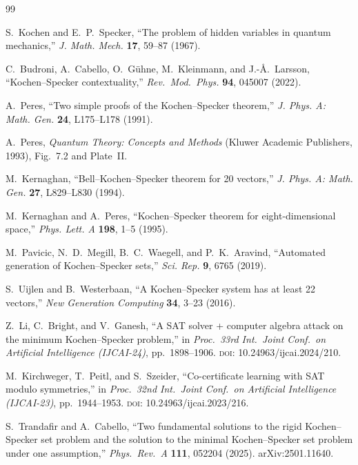 \documentclass[11pt,a4paper]{article}
\theoremstyle{definition}
\theoremstyle{remark}
\begin{document}
\begin{thebibliography}{99}

S.~Kochen and E.~P.~Specker, ``The problem of hidden variables in quantum mechanics,''
\textit{J. Math. Mech.} \textbf{17}, 59--87 (1967).

C.~Budroni, A.~Cabello, O.~G\"uhne, M.~Kleinmann, and J.-\AA.~Larsson,
``Kochen--Specker contextuality,'' \textit{Rev.\ Mod.\ Phys.} \textbf{94}, 045007 (2022).

A.~Peres, ``Two simple proofs of the Kochen--Specker theorem,''
\textit{J. Phys. A: Math. Gen.} \textbf{24}, L175--L178 (1991).

A.~Peres, \textit{Quantum Theory: Concepts and Methods} (Kluwer Academic Publishers, 1993),
Fig.~7.2 and Plate~II.

M.~Kernaghan, ``Bell--Kochen--Specker theorem for 20 vectors,''
\textit{J. Phys. A: Math. Gen.} \textbf{27}, L829--L830 (1994).

M.~Kernaghan and A.~Peres, ``Kochen--Specker theorem for eight-dimensional space,''
\textit{Phys. Lett. A} \textbf{198}, 1--5 (1995).

M.~Pavicic, N.~D.~Megill, B.~C.~Waegell, and P.~K.~Aravind,
``Automated generation of Kochen--Specker sets,'' \textit{Sci. Rep.} \textbf{9}, 6765 (2019).

S.~Uijlen and B.~Westerbaan, ``A Kochen--Specker system has at least 22 vectors,''
\textit{New Generation Computing} \textbf{34}, 3--23 (2016).

Z.~Li, C.~Bright, and V.~Ganesh,
``A SAT solver + computer algebra attack on the minimum Kochen--Specker problem,''
in \textit{Proc.\ 33rd Int.\ Joint Conf.\ on Artificial Intelligence (IJCAI-24)}, pp.~1898--1906.
\textsc{doi}: 10.24963/ijcai.2024/210.

M.~Kirchweger, T.~Peitl, and S.~Szeider,
``Co-certificate learning with SAT modulo symmetries,''
in \textit{Proc.\ 32nd Int.\ Joint Conf.\ on Artificial Intelligence (IJCAI-23)}, pp.~1944--1953.
\textsc{doi}: 10.24963/ijcai.2023/216.

S.~Trandafir and A.~Cabello,
``Two fundamental solutions to the rigid Kochen--Specker set problem and the solution to the
minimal Kochen--Specker set problem under one assumption,''
\textit{Phys.\ Rev.\ A} \textbf{111}, 052204 (2025).  arXiv:2501.11640.


\end{thebibliography}
\end{document}
